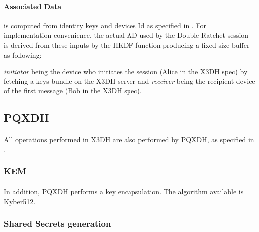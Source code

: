 \documentclass[a4paper,11pt]{article}
\begin{document}
      \label{subsubsec:X3DHAD}
      \paragraph{Associated Data} is computed from identity keys and devices Id as specified in \cite[section 3.3]{x3dh}. For implementation convenience, the actual AD used by the Double Ratchet session is derived from these inputs by the HKDF function producing a fixed size buffer as following:
          \textit{initiator} being the device who initiates the session (Alice in the X3DH spec) by fetching a keys bundle on the X3DH server and \textit{receiver} being the recipient device of the first message (Bob in the X3DH spec).

  \subsection{PQXDH}
    \paragraph*{}All operations performed in X3DH are also performed by PQXDH, as specified in \cite{pqxdh}.
    \subsubsection{KEM}
    \paragraph*{}In addition, PQXDH performs a key encapsulation. The algorithm available is Kyber512.
    \subsubsection{Shared Secrets generation}
\end{document}
